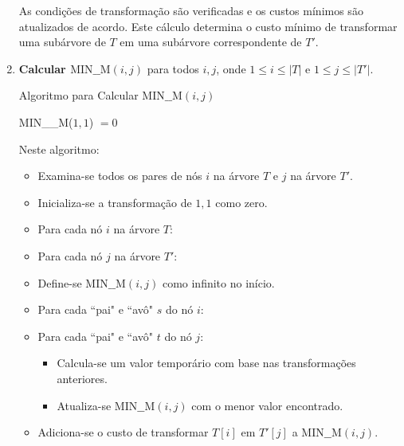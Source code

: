 \documentclass[12pt]{article}
\begin{document}
\begin{enumerate}
\begin{itemize}
\end{itemize}


As condições de transformação são verificadas e os custos mínimos são atualizados de acordo. Este cálculo determina o custo mínimo de transformar uma subárvore de \(T\) em uma subárvore correspondente de \(T'\).\\

    \item \textbf{Calcular \( \text{MIN\_\_M}(i, j) \)} para todos \( i, j \), onde \( 1 \leq i \leq |T| \) e \( 1 \leq j \leq |T'| \).

\begin{algorithm}[H]
    \caption{Algoritmo para Calcular \( \text{MIN\_\_M}(i, j) \)}
    MIN\_\_M($1, 1$) $= 0$ \\
\end{algorithm}

Neste algoritmo:
\begin{itemize}
    \item Examina-se todos os pares de nós \(i\) na árvore \(T\) e \(j\) na árvore \(T'\).
    \item Inicializa-se a transformação de \(1,1\) como zero.
    \item Para cada nó \(i\) na árvore \(T\):
    \item Para cada nó \(j\) na árvore \(T'\):
    \item Define-se \( \text{MIN\_\_M}(i, j) \) como infinito no início.
    \item Para cada ``pai" e ``avô" \(s\) do nó \(i\):
    \item Para cada ``pai" e ``avô" \(t\) do nó \(j\):
        \begin{itemize}
            \item Calcula-se um valor temporário com base nas transformações anteriores.
            \item Atualiza-se \( \text{MIN\_\_M}(i, j) \) com o menor valor encontrado.
        \end{itemize}
    \item Adiciona-se o custo de transformar \( T[i] \) em \( T'[j] \) a \( \text{MIN\_\_M}(i, j) \).\\
\end{itemize}


\end{enumerate}
\end{document}
